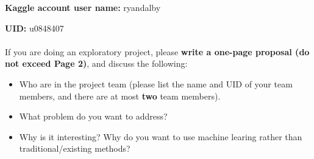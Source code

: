 \documentclass[12pt, fullpage,letterpaper]{article}
\begin{document}
\textbf{Kaggle account user name:} ryandalby

\textbf{UID:} u0848407
\\
\\
\noindent If you are doing an exploratory project, please \textbf{write a one-page proposal (do not exceed Page 2)}, and discuss the following:
\begin{itemize}
	\item Who are in the project team (please list the name and UID of your team members, and there are at most \textbf{two} team members).
	\item What problem do you want to address?
	\item Why is it interesting? Why do you want to use machine learing rather than traditional/existing methods?
\end{itemize}
\end{document}
